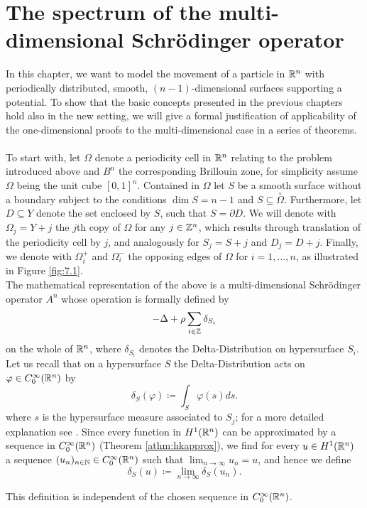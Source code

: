 \chapter{The spectrum of the multi-dimensional Schrödinger operator}  \label{chap:7} 

In this chapter, we want to model the movement of a particle in $\mathbb{R}^{n}$ with periodically distributed, smooth, $(n-1)$-dimensional surfaces supporting a potential. To show that the basic concepts presented in the previous chapters hold also in the new setting, we will give a formal justification of applicability of the one-dimensional proofs to the multi-dimensional case in a series of theorems.
~\\

To start with, let $\Omega$ denote a periodicity cell in $\mathbb{R}^{n}$ relating to the problem introduced above and $B^{n}$ the corresponding Brillouin zone, for simplicity assume $\Omega$ being the unit cube $[0, 1]^{n}$. Contained in $\Omega$ let $S$ be a smooth surface without a boundary subject to the conditions $\dim S = n - 1$ and $S \subseteq \overset{\circ}{\Omega}$. Furthermore, let $D \subseteq Y$ denote the set enclosed by $S$, such that $S = \partial D$. We will denote with $\Omega_{j} = Y + j$ the $j$th copy of $\Omega$ for any $j \in \mathbb{Z}^{n}$, which results through translation of the periodicity cell by $j$, and analogously for $S_{j} = S + j$ and $D_{j} = D + j$. Finally, we denote with $\Omega_{i}^{+}$ and $\Omega_{i}^{-}$ the opposing edges of $\Omega$ for $i = 1, \dotsc, n$, as illustrated in Figure \ref{fig:7.1}.
~\\

The mathematical representation of the above is a multi-dimensional Schrödinger operator $A^{n}$ whose operation is formally defined by
\begin{equation}
	- \Delta + \rho \sum_{i \in \mathbb{Z}} \delta_{S_{i}} \label{eq:7.1-md_the_operator_A_formallyy}
\end{equation}
on the whole of $\mathbb{R}^{n}$, where $\delta_{S_{i}}$ denotes the Delta-Distribution on hypersurface $S_{i}$. Let us recall that on a hypersurface $S$ the Delta-Distribution acts on $\varphi \in C_{0}^{\infty}(\mathbb{R}^{n})$ by 
	\[ \delta_{S}\left(\varphi\right) \coloneqq \int_{S} \varphi(s) ds . \]
where $s$ is the hypersurface measure associated to $S_{j}$; for a more detailed explanation see \cite[Chapter 14]{forster2012analysis}. Since every function in $H^{1}(\mathbb{R}^{n})$ can be approximated by a sequence in $C_{0}^{\infty}(\mathbb{R}^{n})$ (Theorem \ref{athm:hkapprox}), we find for every $u \in H^{1}(\mathbb{R}^{n})$ a sequence $(u_{n})_{n \in \mathbb{N}} \in C_{0}^{\infty}(\mathbb{R}^{n})$ such that $\lim_{n \rightarrow \infty} u_{n} = u$, and hence we define
	\[ \delta_{S}\left(u\right) \coloneqq \lim_{n \rightarrow \infty} \delta_{S}\left(u_{n}\right) . \]
\begin{remark}
	This definition is independent of the chosen sequence in $C_{0}^{\infty}(\mathbb{R}^{n})$.
\end{remark}

